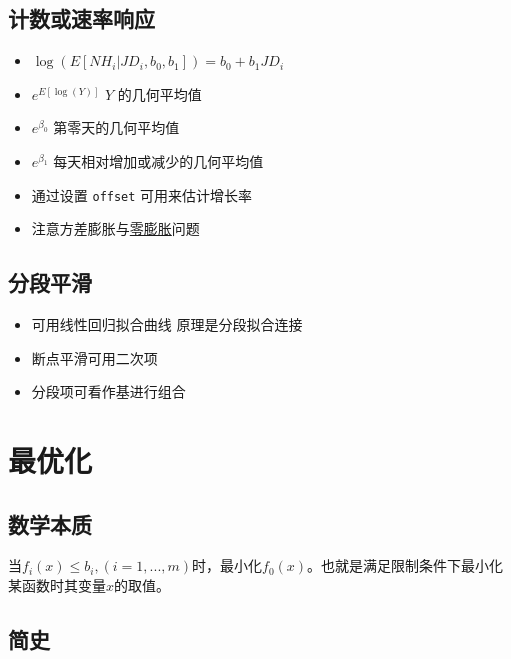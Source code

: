 \documentclass[]{book}
\providecommand{\tightlist}{%
  \setlength{\itemsep}{0pt}\setlength{\parskip}{0pt}}
\begin{document}
\hypertarget{ux8ba1ux6570ux6216ux901fux7387ux54cdux5e94}{%
\section{计数或速率响应}\label{ux8ba1ux6570ux6216ux901fux7387ux54cdux5e94}}

\begin{itemize}
\tightlist
\item
  \(\log\left(E[NH_i | JD_i, b_0, b_1]\right) = b_0 + b_1 JD_i\)
\item
  \(e^{E[\log(Y)]}\) \(Y\) 的几何平均值
\item
  \(e^{\beta_0}\) 第零天的几何平均值
\item
  \(e^{\beta_1}\) 每天相对增加或减少的几何平均值
\item
  通过设置 \texttt{offset} 可用来估计增长率
\item
  注意方差膨胀与\href{http://cran.r-project.org/web/packages/pscl/index.html}{零膨胀}问题
\end{itemize}

\hypertarget{ux5206ux6bb5ux5e73ux6ed1}{%
\section{分段平滑}\label{ux5206ux6bb5ux5e73ux6ed1}}

\begin{itemize}
\tightlist
\item
  可用线性回归拟合曲线 原理是分段拟合连接
\item
  断点平滑可用二次项
\item
  分段项可看作基进行组合
\end{itemize}

\hypertarget{opt}{%
\chapter{最优化}\label{opt}}

\hypertarget{ux6570ux5b66ux672cux8d28}{%
\section{数学本质}\label{ux6570ux5b66ux672cux8d28}}

当\(f_i(x)\leq b_i,(i = 1,...,m)\)时，最小化\(f_0(x)\)。也就是满足限制条件下最小化某函数时其变量\(x\)的取值。

\hypertarget{ux7b80ux53f2}{%
\section{简史}\label{ux7b80ux53f2}}
\end{document}
